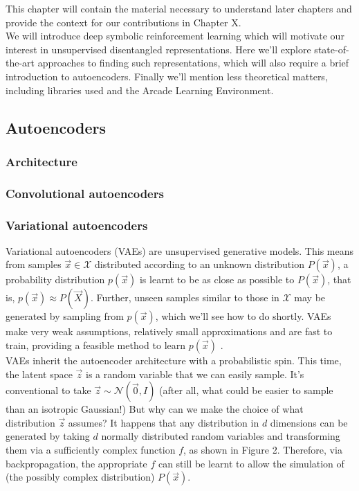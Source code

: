 \documentclass[12pt,twoside]{article}
\begin{document}
This chapter will contain the material necessary to understand later chapters and provide the context for our contributions in Chapter X.\\

We will introduce deep symbolic reinforcement learning which will motivate our interest in unsupervised disentangled representations. Here we'll explore state-of-the-art approaches to finding such representations, which will also require a brief introduction to autoencoders. Finally we'll mention less theoretical matters, including libraries used and the Arcade Learning Environment.

\subsection{Autoencoders}

\subsubsection{Architecture}

\subsubsection{Convolutional autoencoders}

\subsubsection{Variational autoencoders}

Variational autoencoders (VAEs) are unsupervised generative models. This means from samples $\vec{x}\in\mathcal{X}$ distributed according to an unknown distribution $P(\vec{x})$, a probability distribution $p(\vec{x})$ is learnt to be as close as possible to $P(\vec{x})$, that is, $p(\vec{x})\approx P(\vec{X})$. Further, unseen samples similar to those in $\mathcal{X}$ may be generated by sampling from $p(\vec{x})$, which we'll see how to do shortly. VAEs make very weak assumptions, relatively small approximations and are fast to train, providing a feasible method to learn $p(\vec{x})$ \cite{Doersch2016}.\\

VAEs inherit the autoencoder architecture with a probabilistic spin. This time, the latent space $\vec{z}$ is a random variable that we can easily sample. It's conventional to take $\vec{z}\sim\mathcal{N}(\vec{0},I)$ (after all, what could be easier to sample than an isotropic Gaussian!) But why can we make the choice of what distribution $\vec{z}$ assumes? It happens that any distribution in $d$ dimensions can be generated by taking $d$ normally distributed random variables and transforming them via a sufficiently complex function $f$, as shown in Figure 2. Therefore, via backpropagation, the appropriate $f$ can still be learnt to allow the simulation of (the possibly complex distribution) $P(\vec{x})$.\\
\end{document}
